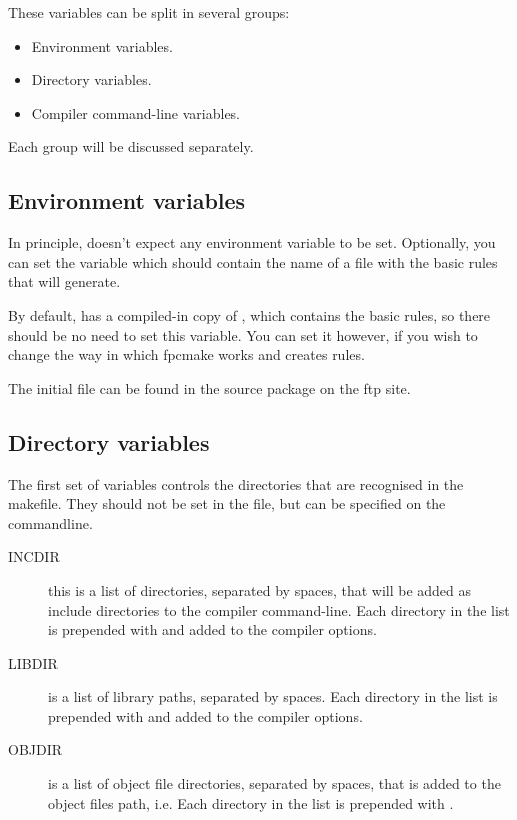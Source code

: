These variables can be split in several groups:
\begin{itemize}
\item Environment variables.
\item Directory variables.
\item Compiler command-line variables.
\end{itemize}
Each group will be discussed separately.

\subsection{Environment variables}

In principle,  doesn't expect any environment variable to be set.
Optionally, you can set the variable  which should contain
the name of a file with the basic rules that  will generate.

By default,  has a compiled-in copy of ,
which contains the basic rules, so there should be no need to set this variable.
You can set it however, if you wish to change the way in which fpcmake works and
creates rules.

The initial  file can be found in the  source
package on the \fpc ftp site.
\subsection{Directory variables}

The first set of variables controls the directories that are
recognised in the makefile. They should not be set in the
 file, but can be specified on the commandline.
\begin{description}
\item[INCDIR] this is a list of directories, separated by spaces, that will
be added as include directories to the compiler command-line.  Each
directory in the list is prepended with  and added to the
compiler options.
\item[LIBDIR] is a list of library paths, separated by spaces. Each
directory in the list is prepended with  and added to the
compiler options.
\item[OBJDIR] is a list of object file directories, separated by spaces, that is
added to the object files path, i.e. Each directory in the list is prepended with
.
\end{description}

